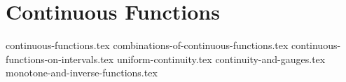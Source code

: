 \chapter{Continuous Functions}
{continuous-functions.tex}
{combinations-of-continuous-functions.tex}
{continuous-functions-on-intervals.tex}
{uniform-continuity.tex}
{continuity-and-gauges.tex}
{monotone-and-inverse-functions.tex}
